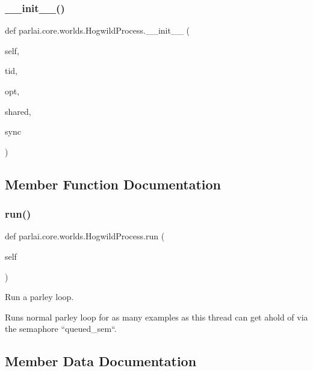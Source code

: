 \subsubsection{\texorpdfstring{\+\_\+\+\_\+init\+\_\+\+\_\+()}{\_\_init\_\_()}}
{\footnotesize\ttfamily def parlai.\+core.\+worlds.\+Hogwild\+Process.\+\_\+\+\_\+init\+\_\+\+\_\+ (\begin{DoxyParamCaption}\item[{}]{self,  }\item[{}]{tid,  }\item[{}]{opt,  }\item[{}]{shared,  }\item[{}]{sync }\end{DoxyParamCaption})}



\subsection{Member Function Documentation}
\mbox{\label{classparlai_1_1core_1_1worlds_1_1HogwildProcess_a749caf3085cb7b373db66b6f92567290}} 
\subsubsection{\texorpdfstring{run()}{run()}}
{\footnotesize\ttfamily def parlai.\+core.\+worlds.\+Hogwild\+Process.\+run (\begin{DoxyParamCaption}\item[{}]{self }\end{DoxyParamCaption})}

\begin{DoxyVerb}Run a parley loop.

Runs normal parley loop for as many examples as this thread can get ahold of via
the semaphore ``queued_sem``.
\end{DoxyVerb}
 

\subsection{Member Data Documentation}
\mbox{\label{classparlai_1_1core_1_1worlds_1_1HogwildProcess_a4266e7c47686cd9b4fa9d62ae84375c8}} 
